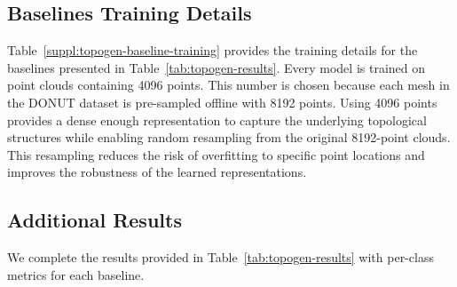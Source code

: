 \subsection{Baselines Training Details}
\label{ssec:topogen-baseline-training}

Table~\ref{suppl:topogen-baseline-training} provides the training details for the baselines presented in Table~\ref{tab:topogen-results}. Every model is trained on point clouds containing 4096 points. This number is chosen because each mesh in the DONUT dataset is pre-sampled offline with 8192 points. Using 4096 points provides a dense enough representation to capture the underlying topological structures while enabling random resampling from the original 8192-point clouds. This resampling reduces the risk of overfitting to specific point locations and improves the robustness of the learned representations.


\subsection{Additional Results}
\label{ssec:topogen-additional-results}

We complete the results provided in Table~\ref{tab:topogen-results} with per-class metrics for each baseline. 
